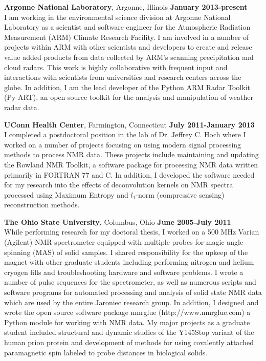 \documentclass[margin,line]{res}
\begin{document}
\begin{resume}
{\bf Argonne National Laboratory}, Argonne, Illinois 
\hfill {\bf January 2013-present}\\
I am working in the environmental science division at 
Argonne National Laboratory as a scientist and software engineer 
for the Atmospheric Radiation Measurement (ARM) Climate Research Facility.
I am involved in a number of projects within ARM with other scientists and
developers to create and release value added products from data collected
by ARM’s scanning precipitation and cloud radars.  This work is highly 
collaborative with frequent input and interactions with scientists from 
universities and research centers across the globe.  In addition, 
I am the lead developer of the Python ARM Radar Toolkit (Py-ART),
an open source toolkit for the analysis and manipulation of weather radar data.

{\bf UConn Health Center}, Farmington, Connecticut
\hfill {\bf July 2011-January 2013}\\
I completed a postdoctoral position in the lab of Dr. Jeffrey C. Hoch 
where I worked on a number of projects focusing on using modern signal
processing methods to process NMR data. These projects include maintaining
and updating the Rowland NMR Toolkit, a software package for processing
NMR data written primarily in FORTRAN 77 and C.
In addition, I developed the software needed for my research into the 
effects of deconvolution kernels on NMR spectra processed using 
Maximum Entropy and $l_1$-norm (compressive sensing) reconstruction methods. 


{\bf The Ohio State University}, Columbus, Ohio
\hfill {\bf June 2005-July 2011}\\
While performing research for my doctoral thesis, I worked on a
500 MHz Varian (Agilent) NMR spectrometer equipped with multiple probes
for magic angle spinning (MAS) of solid samples.  I shared responsibility for
the upkeep of the magnet with other graduate students including 
performing nitrogen and helium cryogen fills and troubleshooting hardware
and software problems. I wrote a number of pulse sequences for the 
spectrometer, as well as numerous scripts and software programs for
automated processing and analysis of solid state NMR data which are used 
by the entire Jaroniec research group.  In addition, I designed and wrote
the open source software package nmrglue (http://www.nmrglue.com) a 
Python module for working with NMR data.  
My major projects as a graduate student included structural and 
dynamic studies of the Y145Stop variant of the human prion protein and
development of methods for using covalently attached paramagnetic spin
labeled to probe distances in biological solids.


\end{resume}
\end{document}
